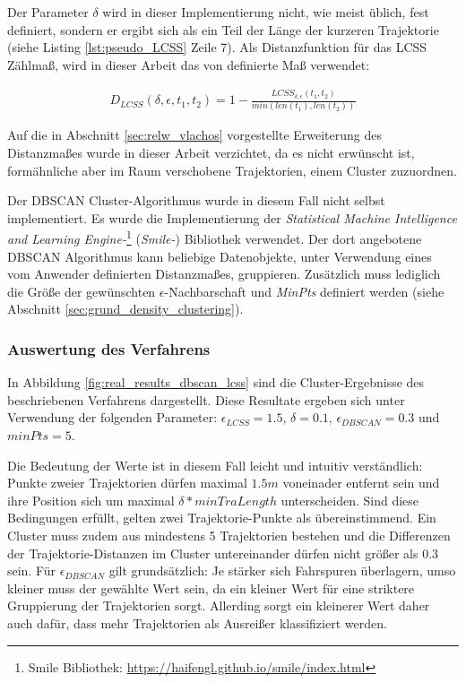 Der Parameter $\delta$ wird in dieser Implementierung nicht, wie meist üblich, fest definiert, sondern er ergibt sich als
ein Teil der Länge der kurzeren Trajektorie (siehe Listing \ref{lst:pseudo_LCSS} Zeile 7).
Als Distanzfunktion für das LCSS Zählmaß, wird in dieser Arbeit das von \cite[]{Vlachos2002} definierte
Maß verwendet:

\begin{ceqn}
\begin{align*}
    D_{LCSS}(\delta, \epsilon, t_1, t_2) = 1 - \frac{LCSS_{\delta, \epsilon}(t_1, t_2)}{min(len(t_1), len(t_2))}
\end{align*}
\end{ceqn}

Auf die in Abschnitt \ref{sec:relw_vlachos} vorgestellte Erweiterung des Distanzmaßes wurde in dieser Arbeit verzichtet,
da es nicht erwünscht ist, formähnliche aber im Raum verschobene Trajektorien, einem Cluster zuzuordnen.

Der DBSCAN Cluster-Algorithmus wurde in diesem Fall nicht selbst implementiert. Es wurde die Implementierung
der \textit{Statistical Machine Intelligence and Learning Engine-}\footnote{Smile Bibliothek: \url{https://haifengl.github.io/smile/index.html}}
(\textit{Smile-}) Bibliothek verwendet. Der dort angebotene DBSCAN Algorithmus kann beliebige Datenobjekte, unter Verwendung eines
vom Anwender definierten Distanzmaßes, gruppieren. Zusätzlich muss lediglich die Größe der gewünschten
$\epsilon$-Nachbarschaft und \textit{MinPts} definiert werden (siehe Abschnitt \ref{sec:grund_density_clustering}).

\subsubsection{Auswertung des Verfahrens}
\label{sec:results_clustering_dbscan_lcss}

In Abbildung \ref{fig:real_results_dbscan_lcss} sind die Cluster-Ergebnisse des beschriebenen Verfahrens
dargestellt. Diese Resultate ergeben sich unter Verwendung der folgenden Parameter:
$\epsilon_{LCSS} = 1.5$, $\delta = 0.1$, $\epsilon_{DBSCAN} = 0.3$ und $minPts = 5$.

Die Bedeutung der Werte ist in diesem Fall leicht und intuitiv verständlich: Punkte zweier Trajektorien
dürfen maximal $1.5m$ voneinader entfernt sein und ihre Position sich um maximal $\delta * minTraLength$ unterscheiden.
Sind diese Bedingungen erfüllt, gelten zwei Trajektorie-Punkte als übereinstimmend. Ein Cluster muss zudem aus mindestens
5 Trajektorien bestehen und die Differenzen der Trajektorie-Distanzen im Cluster untereinander dürfen nicht größer als 0.3 sein.
Für $\epsilon_{DBSCAN}$ gilt grundsätzlich: Je stärker sich Fahrspuren überlagern, umso kleiner muss der gewählte Wert sein, da
ein kleiner Wert für eine striktere Gruppierung der Trajektorien sorgt. Allerding sorgt ein kleinerer Wert
daher auch dafür, dass mehr Trajektorien als Ausreißer klassifiziert werden.

